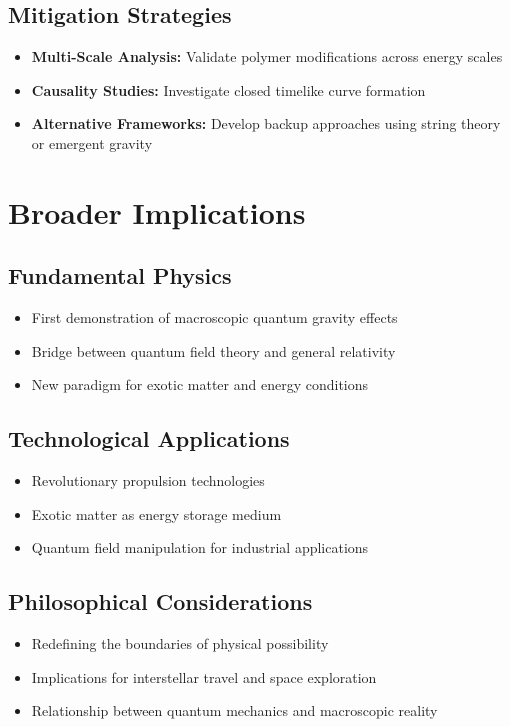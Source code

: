 \documentclass[11pt]{article}
\begin{document}
\subsection{Mitigation Strategies}
\begin{itemize}
  \item \textbf{Multi-Scale Analysis:} Validate polymer modifications across energy scales
  \item \textbf{Causality Studies:} Investigate closed timelike curve formation
  \item \textbf{Alternative Frameworks:} Develop backup approaches using string theory or emergent gravity
\end{itemize}

\section{Broader Implications}

\subsection{Fundamental Physics}
\begin{itemize}
  \item First demonstration of macroscopic quantum gravity effects
  \item Bridge between quantum field theory and general relativity
  \item New paradigm for exotic matter and energy conditions
\end{itemize}

\subsection{Technological Applications}
\begin{itemize}
  \item Revolutionary propulsion technologies
  \item Exotic matter as energy storage medium
  \item Quantum field manipulation for industrial applications
\end{itemize}

\subsection{Philosophical Considerations}
\begin{itemize}
  \item Redefining the boundaries of physical possibility
  \item Implications for interstellar travel and space exploration
  \item Relationship between quantum mechanics and macroscopic reality
\end{itemize}
\end{document}
